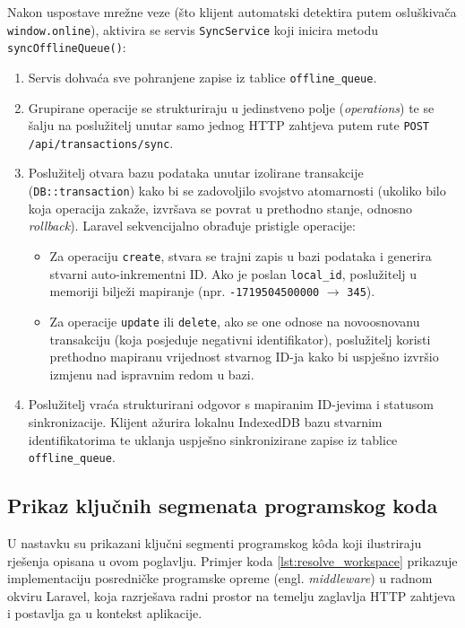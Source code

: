 \documentclass[a4paper,12pt,oneside]{article}
\begin{document}
	Nakon uspostave mrežne veze (što klijent automatski detektira putem osluškivača \texttt{window.online}), aktivira se servis \texttt{SyncService} koji inicira metodu \texttt{syncOfflineQueue()}:
	\begin{enumerate}
		\item Servis dohvaća sve pohranjene zapise iz tablice \texttt{offline\_queue}.
		
		\item Grupirane operacije se strukturiraju u jedinstveno polje (\textit{operations}) te se šalju na poslužitelj unutar samo jednog HTTP zahtjeva putem rute \texttt{POST /api/transactions/sync}.
		
		\item Poslužitelj otvara bazu podataka unutar izolirane transakcije (\texttt{DB::transaction}) kako bi se zadovoljilo svojstvo atomarnosti (ukoliko bilo koja operacija zakaže, izvršava se povrat u prethodno stanje, odnosno \textit{rollback}). Laravel sekvencijalno obrađuje pristigle operacije:
		\begin{itemize}
			\item Za operaciju \texttt{create}, stvara se trajni zapis u bazi podataka i generira stvarni auto-inkrementni ID. Ako je poslan \texttt{local\_id}, poslužitelj u memoriji bilježi mapiranje (npr. \texttt{-1719504500000} $\rightarrow$ \texttt{345}).
			
			\item Za operacije \texttt{update} ili \texttt{delete}, ako se one odnose na novoosnovanu transakciju (koja posjeduje negativni identifikator), poslužitelj koristi prethodno mapiranu vrijednost stvarnog ID-ja kako bi uspješno izvršio izmjenu nad ispravnim redom u bazi.
		\end{itemize}
		
		\item Poslužitelj vraća strukturirani odgovor s mapiranim ID-jevima i statusom sinkronizacije. Klijent ažurira lokalnu IndexedDB bazu stvarnim identifikatorima te uklanja uspješno sinkronizirane zapise iz tablice \texttt{offline\_queue}.
	\end{enumerate}
		
	\newpage

	\subsection{Prikaz ključnih segmenata programskog koda}
	U nastavku su prikazani ključni segmenti programskog kôda koji ilustriraju rješenja opisana u ovom poglavlju. Primjer koda \ref{lst:resolve_workspace} prikazuje implementaciju posredničke programske opreme (engl. \textit{middleware}) u radnom okviru Laravel, koja razrješava radni prostor na temelju zaglavlja HTTP zahtjeva i postavlja ga u kontekst aplikacije.
\end{document}
